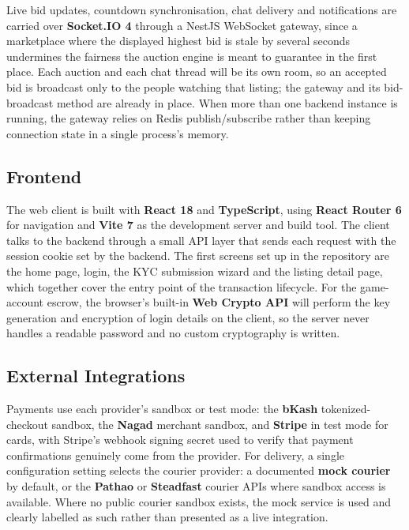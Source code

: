 \documentclass[11pt,a4paper]{article}
\begin{document}
Live bid updates, countdown synchronisation, chat delivery and notifications are carried over
\textbf{Socket.IO 4} through a NestJS WebSocket gateway, since a marketplace where the displayed highest bid
is stale by several seconds undermines the fairness the auction engine is meant to guarantee in the first
place. Each auction and each chat thread will be its own room, so an accepted bid is broadcast only to the
people watching that listing; the gateway and its bid-broadcast method are already in place. When more than one backend instance is running, the gateway relies on Redis
publish/subscribe rather than keeping connection state in a single process's memory.

\subsection{Frontend}

The web client is built with \textbf{React 18} and \textbf{TypeScript}, using \textbf{React Router 6} for
navigation and \textbf{Vite 7} as the development server and build tool. The client talks to the backend
through a small API layer that sends each request with the session cookie set by the backend. The first screens set up in the
repository are the home page, login, the KYC submission wizard and the listing detail page, which together
cover the entry point of the transaction lifecycle. For the game-account escrow, the browser's built-in
\textbf{Web Crypto API} will perform the key generation and encryption of login details on the client, so
the server never handles a readable password and no custom cryptography is written.

\subsection{External Integrations}

Payments use each provider's sandbox or test mode: the \textbf{bKash} tokenized-checkout sandbox, the
\textbf{Nagad} merchant sandbox, and \textbf{Stripe} in test mode for cards, with Stripe's webhook signing
secret used to verify that payment confirmations genuinely come from the provider. For delivery, a single
configuration setting selects the courier provider: a documented \textbf{mock courier} by default, or the
\textbf{Pathao} or \textbf{Steadfast} courier APIs where sandbox access is available. Where no public courier
sandbox exists, the mock service is used and clearly labelled as such rather than presented as a live
integration.
\end{document}
